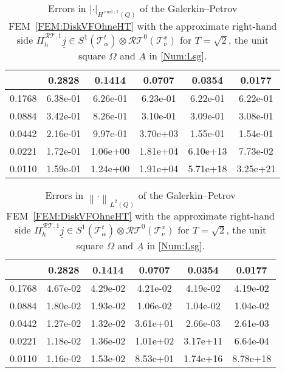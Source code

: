 \documentclass[a4paper,11pt]{article}
\newcommand{\cu}{\operatorname{curl}}
\renewcommand{\vec}[1]{\underline{#1}}
\newcommand{\abs}[1]{\left\lvert{#1}\right\rvert}
\newcommand{\norm}[1]{{\left\lVert{#1}\right\rVert}}
\begin{document}
\begin{table}[ht!]
	\begin{center}
		\begin{footnotesize}\begin{tabular}{r||c|c|c|c|c}
				\diagbox{$h_x$}{\vspace*{-.1cm}$h_t$} & 0.2828 & 0.1414 & 0.0707 & 0.0354 & 0.0177   \\
				\hline\hline
				0.1768 & 6.38e-01 & 6.26e-01 & 6.23e-01 & 6.22e-01 & 6.22e-01 \\
				0.0884 & 3.42e-01 & 8.26e-01 & 3.10e-01 & 3.09e-01 & 3.08e-01 \\
				0.0442 & 2.16e-01 & 9.97e-01 & 3.70e+03 & 1.55e-01 & 1.54e-01 \\
				0.0221 & 1.72e-01 & 1.06e+00 & 1.81e+04 & 6.10e+13 & 7.73e-02 \\
				0.0110 & 1.59e-01 & 1.24e+00 & 1.91e+04 & 5.71e+18 & 3.25e+21
		\end{tabular}\end{footnotesize}
		\caption{Errors in $\abs{\cdot}_{H^{\cu;1}(Q)}$ of the Galerkin--Petrov FEM~\eqref{FEM:DiskVFOhneHT} with the approximate right-hand side $\Pi_h^{\mathcal{RT},1} \vec j \in S^1(\mathcal T^t_\alpha) \otimes \mathcal{RT}^0(\mathcal T^x_\nu)$ for $T=\sqrt{2}$, the unit square $\Omega$ and $\vec A$ in \eqref{Num:Lsg}.} \label{Num:Tab:OhneRTH1Curl}
	\end{center}
\end{table}

\begin{table}[ht!]
	\begin{center}
		\begin{footnotesize}\begin{tabular}{r||c|c|c|c|c}
				\diagbox{$h_x$}{\vspace*{-.1cm}$h_t$} & 0.2828 & 0.1414 & 0.0707 & 0.0354 & 0.0177   \\
				\hline\hline
				0.1768 & 4.67e-02 & 4.29e-02 & 4.21e-02 & 4.19e-02 & 4.19e-02 \\
				0.0884 & 1.80e-02 & 1.93e-02 & 1.06e-02 & 1.04e-02 & 1.04e-02 \\
				0.0442 & 1.27e-02 & 1.32e-02 & 3.61e+01 & 2.66e-03 & 2.61e-03 \\
				0.0221 & 1.18e-02 & 1.36e-02 & 1.01e+02 & 3.17e+11 & 6.64e-04 \\
				0.0110 & 1.16e-02 & 1.53e-02 & 8.53e+01 & 1.74e+16 & 8.78e+18
		\end{tabular}\end{footnotesize}
		\caption{Errors in $\norm{\cdot}_{L^2(Q)}$ of the Galerkin--Petrov FEM~\eqref{FEM:DiskVFOhneHT} with the approximate right-hand side $\Pi_h^{\mathcal{RT},1} \vec j \in S^1(\mathcal T^t_\alpha) \otimes \mathcal{RT}^0(\mathcal T^x_\nu)$ for $T=\sqrt{2}$, the unit square $\Omega$ and $\vec A$ in \eqref{Num:Lsg}.} \label{Num:Tab:OhneRTL2}
	\end{center}
\end{table}
\end{document}
